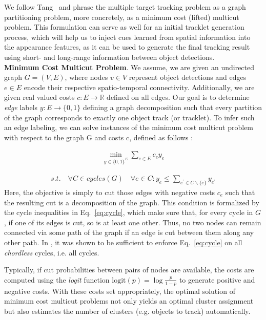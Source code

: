 We follow Tang~\cite{tang2017multiple} and phrase the multiple target tracking problem as a graph partitioning problem, more concretely, as a minimum cost (lifted) multicut problem. This formulation can serve as well for an initial tracklet generation process, which will help us to inject cues learned from spatial information into the appearance features, as it can be used to generate the final tracking result using short- and long-range information between object detections. \\

\noindent\textbf{Minimum Cost Multicut Problem}.
We assume, we are given an undirected graph {\it $G = (V, E)$}, where nodes $v\in V$ represent object detections and edges $e\in E$ encode their respective spatio-temporal connectivity. 
Additionally, we are given real valued costs {\it $c: E \rightarrow \mathbb{R}$} defined on all edges. 
Our goal is to determine \emph{edge} labels {\it $y: E \rightarrow \{0, 1\}$} defining a graph decomposition such that every partition of the graph corresponds to exactly one object track (or tracklet). 
To infer such an edge labeling, we can solve instances of the minimum cost multicut problem with respect to the graph G and costs c, defined as follows \cite{chopra-1993,demaine-2006}:

\begin{align}
\min\limits_{y \in \{0, 1\}^E}
\sum\limits_{e \in E} c_e y_e
\label{eq:mc}
\end{align}

\begin{align}
s.t. \quad \forall C \in cycles(G) \quad \forall e \in C : y_e \leq \sum\limits_{e^\prime \in C\backslash\{e\}} y_{e^\prime}
\label{eq:cycle}
\end{align}
Here, the objective is simply to cut those edges with negative costs $c_e$ such that the resulting cut is a decomposition of the graph. 
This condition is formalized by the cycle inequalities in Eq.~\eqref{eq:cycle}, which make sure that, for every cycle in $G$, if one of its edges is cut, so is at least one other.
Thus, no two nodes can remain connected via some path of the graph if an edge is cut between them along any other path. 
In \cite{chopra-1993}, it was shown to be sufficient to enforce Eq.~\eqref{eq:cycle} on all \emph{chordless} cycles, i.e. all cycles.

Typically, if cut probabilities between pairs of nodes are available, the costs are computed using the \emph{logit} function $\text{logit}(p) = \log\frac{p}{1-p}$  to generate positive and negative costs.
With these costs set appropriately, the optimal solution of minimum cost multicut problems not only yields an optimal cluster assignment but also estimates the number of clusters (e.g. objects to track) automatically. 

